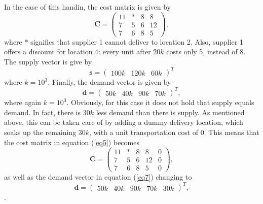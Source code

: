 \documentclass{article}
\begin{document}
  \noindent
  In the case of this handin, the cost matrix is given by
  \begin{equation}
    \mathbf{C} = 
    \begin{pmatrix}
      11 & * & 8 & 8 \\
      7  & 5 & 6 & 12 \\
      7  & 6 & 8 & 5
    \end{pmatrix},
    \label{eq5}
  \end{equation}
  where $*$ signifies that supplier 1 cannot deliver to location 2. Also, supplier 1 offers a discount for location 4: every unit after $20k$ costs only 5, instead of 8.
  The supply vector is give by
  \begin{equation}
    \mathbf{s} =
    \begin{pmatrix}
      100k & 120k & 60k
    \end{pmatrix}^T
    \label{eq6}
  \end{equation}
  where $k = 10^3$. Finally, the demand vector is given by
  \begin{equation}
    \mathbf{d} =
    \begin{pmatrix}
      50k & 40k & 90k & 70k
    \end{pmatrix}^T,
    \label{eq7}
  \end{equation}
  where again $k = 10^3$. Obviously, for this case it does not hold that supply equals demand. In fact, there is $30k$ less demand than there is supply. As mentioned above, this can be taken care of by adding a dummy delivery location, which soaks up the remaining $30k$, with
  a unit transportation cost of $0$. This means that the cost matrix in equation (\ref{eq5}) becomes
  \begin{equation}
    \mathbf{C} = 
    \begin{pmatrix}
      11 & * & 8 & 8  & 0\\
      7  & 5 & 6 & 12 & 0\\
      7  & 6 & 8 & 5  & 0
    \end{pmatrix},
    \label{eq8}
  \end{equation}
  as well as the demand vector in equation (\ref{eq7}) changing to
  \begin{equation}
    \mathbf{d} =
    \begin{pmatrix}
      50k & 40k & 90k & 70k & 30k
    \end{pmatrix}^T,
    \label{eq9}
  \end{equation}.
\end{document}
